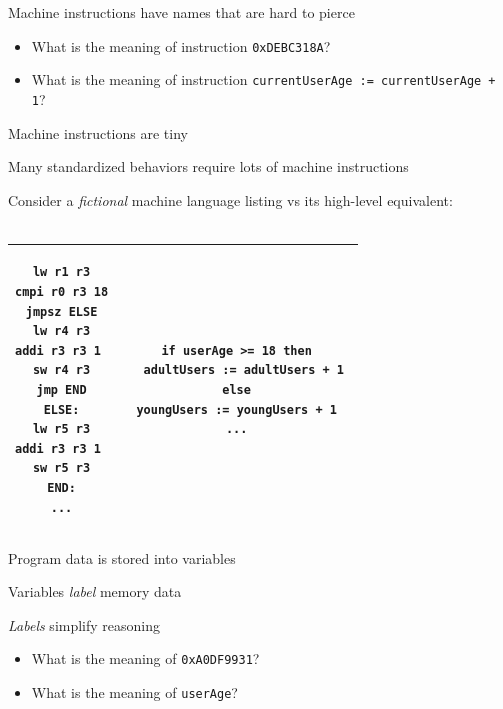 \documentclass{beamer}
\begin{document}
\begin{slide}{
\item Machine instructions have names that are hard to pierce
\pause
\begin{itemize}
\item What is the meaning of instruction \texttt{0xDEBC318A}?
\pause
\item What is the meaning of instruction \texttt{currentUserAge := currentUserAge + 1}?
\end{itemize}
}\end{slide}

\begin{slide}{
\item Machine instructions are tiny
\item Many standardized behaviors require lots of machine instructions
}\end{slide}

\begin{frame}[fragile]
Consider a \textit{fictional} machine language listing vs its high-level equivalent: \\ \ \\

\begin{tabular}{| c | c |}
\hline
\begin{lstlisting}
lw r1 r3
cmpi r0 r3 18
jmpsz ELSE
lw r4 r3
addi r3 r3 1 
sw r4 r3
jmp END
ELSE:
lw r5 r3
addi r3 r3 1 
sw r5 r3
END:
...
\end{lstlisting}

&

\begin{lstlisting}
if userAge >= 18 then
  adultUsers := adultUsers + 1
else
  youngUsers := youngUsers + 1  
...
\end{lstlisting}

\\
\hline
\end{tabular}
\end{frame}

\begin{slide}{
\item Program data is stored into variables
\item Variables \textit{label} memory data
\item \textit{Labels} simplify reasoning
\pause
\begin{itemize}
\item What is the meaning of \texttt{0xA0DF9931}?
\pause
\item What is the meaning of \texttt{userAge}?
\end{itemize}
}\end{slide}
\end{document}
